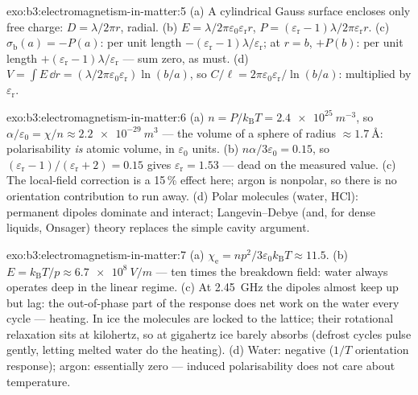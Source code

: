 \begin{solution}{exo:b3:electromagnetism-in-matter:5}
(a) A cylindrical Gauss surface encloses only free charge:
$D = \lambda/2\pi r$, radial. (b) $E =
\lambda/2\pi\varepsilon_0\varepsilon_{\text{r}}r$, $P =
(\varepsilon_{\text{r}}-1)\lambda/2\pi\varepsilon_{\text{r}}r$.
(c) $\sigma_{\text{b}}(a) = -P(a)$: per unit length
$-(\varepsilon_{\text{r}}-1)\lambda/\varepsilon_{\text{r}}$;
at $r = b$, $+P(b)$: per unit length
$+(\varepsilon_{\text{r}}-1)\lambda/\varepsilon_{\text{r}}$ ---
sum zero, as  must. (d) $V = \int E\,\dd r =
(\lambda/2\pi\varepsilon_0\varepsilon_{\text{r}})\ln(b/a)$, so
$C/\ell = 2\pi\varepsilon_0\varepsilon_{\text{r}}/\ln(b/a)$:
multiplied by $\varepsilon_{\text{r}}$.
\end{solution}

\begin{solution}{exo:b3:electromagnetism-in-matter:6}
(a) $n = P/k_{\text{B}}T = \qty{2.4e25}{m^{-3}}$, so
$\alpha/\varepsilon_0 = \chi/n \approx \qty{2.2e-29}{m^3}$ ---
the volume of a sphere of radius $\approx\qty{1.7}{\angstrom}$:
polarisability \emph{is} atomic volume, in $\varepsilon_0$ units.
(b) $n\alpha/3\varepsilon_0 = 0.15$, so $(\varepsilon_{\text{r}} -
1)/(\varepsilon_{\text{r}} + 2) = 0.15$ gives
$\varepsilon_{\text{r}} = 1.53$ --- dead on the measured value.
(c) The local-field correction is a 15\,\% effect here; argon is
nonpolar, so there is no orientation contribution to run away. (d)
Polar molecules (water, HCl): permanent dipoles dominate and
interact; Langevin--Debye (and, for dense liquids, Onsager) theory
replaces the simple cavity argument.
\end{solution}

\begin{solution}{exo:b3:electromagnetism-in-matter:7}
(a) $\chi_{\text{e}} = np^2/3\varepsilon_0k_{\text{B}}T \approx
11.5$. (b) $E = k_{\text{B}}T/p \approx \qty{6.7e8}{V/m}$ ---
ten times the breakdown field: water always operates deep in the
linear regime. (c) At \qty{2.45}{GHz} the dipoles almost keep up
but lag: the out-of-phase part of the response does net work on
the water every cycle ---  heating. In ice the molecules
are locked to the lattice; their rotational relaxation sits at
kilohertz, so at gigahertz ice barely absorbs (defrost cycles
pulse gently, letting melted water do the heating). (d) Water:
negative ($1/T$ orientation response); argon: essentially zero ---
induced polarisability does not care about temperature.
\end{solution}


